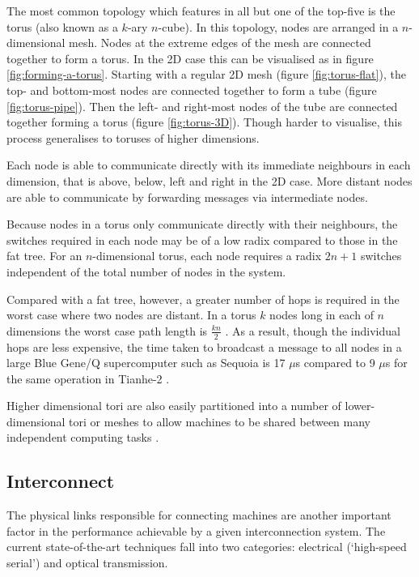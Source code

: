				The most common topology which features in all but one of the top-five
				is the torus (also known as a $k$-ary $n$-cube). In this topology, nodes
				are arranged in a $n$-dimensional mesh. Nodes at the extreme edges of
				the mesh are connected together to form a torus. In the 2D case this can
				be visualised as in figure \ref{fig:forming-a-torus}. Starting with a
				regular 2D mesh (figure \ref{fig:torus-flat}), the top- and bottom-most
				nodes are connected together to form a tube (figure
				\ref{fig:torus-pipe}).  Then the left- and right-most nodes of the tube
				are connected together forming a torus (figure \ref{fig:torus-3D}).
				Though harder to visualise, this process generalises to toruses of
				higher dimensions.
				
				Each node is able to communicate directly with its immediate neighbours
				in each dimension, that is above, below, left and right in the 2D case.
				More distant nodes are able to communicate by forwarding messages via
				intermediate nodes.
				
				Because nodes in a torus only communicate directly with their
				neighbours, the switches required in each node may be of a low radix
				compared to those in the fat tree. For an $n$-dimensional torus, each
				node requires a radix $2n+1$ switches independent of the total number of
				nodes in the system.
				
				Compared with a fat tree, however, a greater number of hops is required
				in the worst case where two nodes are distant. In a torus $k$ nodes long
				in each of $n$ dimensions the worst case path length is $\frac{kn}{2}$
				\cite{dally04}. As a result, though the individual hops are less
				expensive, the time taken to broadcast a message to all nodes in a large
				Blue Gene/Q supercomputer such as Sequoia is 17 $\mu$s compared to 9
				$\mu$s for the same operation in Tianhe-2 \cite{morozov12}.
				
				Higher dimensional tori are also easily partitioned into a number of
				lower-dimensional tori or meshes to allow machines to be shared between
				many independent computing tasks \cite{yokokawa11,chen11}.
		
		\subsection{Interconnect}
			
			The physical links responsible for connecting machines are another
			important factor in the performance achievable by a given interconnection
			system. The current state-of-the-art techniques fall into two categories:
			electrical (`high-speed serial') and optical transmission.
			
